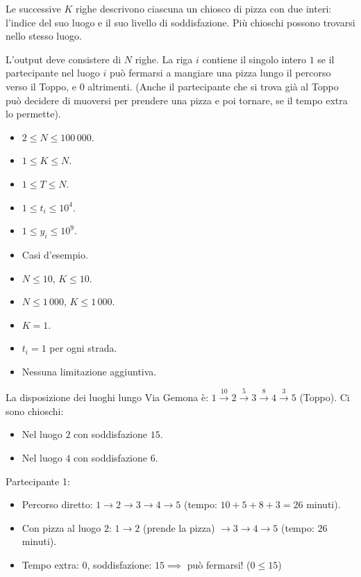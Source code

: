 Le successive $K$ righe descrivono ciascuna un chiosco di pizza con due interi: l'indice del suo luogo e il suo livello di soddisfazione. Più chioschi possono trovarsi nello stesso luogo.

\OutputFile
L'output deve consistere di $N$ righe. La riga $i$ contiene il singolo intero $1$ se il partecipante nel luogo $i$ può fermarsi a mangiare una pizza lungo il percorso verso il Toppo, e $0$ altrimenti. (Anche il partecipante che si trova già al Toppo può decidere di muoversi per prendere una pizza e poi tornare, se il tempo extra lo permette).

\Constraints
\begin{itemize}
    \item $2 \le N \le 100\,000$.
    \item $1 \le K \le N$.
    \item $1 \le T \le N$.
    \item $1 \le t_i \le 10^4$.
    \item $1 \le y_i \le 10^9$.
\end{itemize}

\Scoring
\begin{itemize}
    \item \subtask Casi d'esempio.
    \item \subtask $N \le 10$, $K \le 10$.
    \item \subtask $N \le 1\,000$, $K \le 1\,000$.
    \item \subtask $K = 1$.
    \item \subtask $t_i = 1$ per ogni strada.
    \item \subtask Nessuna limitazione aggiuntiva.
\end{itemize}

\Examples
\begin{example}
\end{example}

\Explanations
La disposizione dei luoghi lungo Via Gemona è: $1 \xrightarrow{10} 2 \xrightarrow{5} 3 \xrightarrow{8} 4 \xrightarrow{3} 5$ (Toppo).
Ci sono chioschi:
\begin{itemize}
    \item Nel luogo $2$ con soddisfazione $15$.
    \item Nel luogo $4$ con soddisfazione $6$.
\end{itemize}

Partecipante 1:
\begin{itemize}
    \item Percorso diretto: $1 \to 2 \to 3 \to 4 \to 5$ (tempo: $10+5+8+3 = 26$ minuti).
    \item Con pizza al luogo $2$: $1 \to 2$ (prende la pizza) $\to 3 \to 4 \to 5$ (tempo: $26$ minuti).
    \item Tempo extra: $0$, soddisfazione: $15 \implies$ può fermarsi! ($0 \le 15$) \checkmark
\end{itemize}

